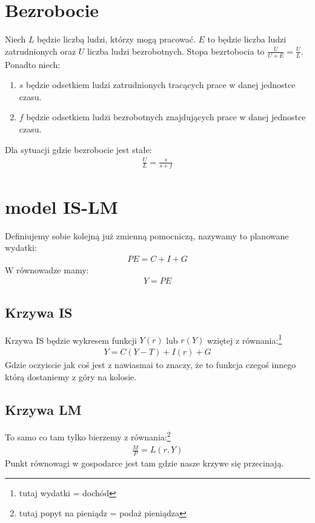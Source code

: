\documentclass{article}
\begin{document}
\section{Bezrobocie}
Niech \(L\) będzie liczbą ludzi, którzy mogą pracować. \(E\) to będzie
liczba ludzi zatrudnionych oraz \(U\) liczba ludzi bezrobotnych. 
Stopa bezrtobocia to \(\frac{U}{U+E} = \frac{U}{L}\). Ponadto niech:
\begin{enumerate}
    \item \(s\) będzie odsetkiem ludzi zatrudnionych tracących prace w danej jednostce czasu.
    \item \(f\) będzie odsetkiem ludzi bezrobotnych znajdujących prace w danej jednostce czasu.
\end{enumerate}
Dla sytuacji gdzie bezrobocie jest stałe:
\begin{gather}
    \frac{U}{L} = \frac{s}{s+f}
\end{gather}
\section{model IS-LM}
Definiujemy sobie kolejną już zmienną pomocniczą, nazywamy to planowane wydatki:
\begin{gather}
    PE = C + I + G
\end{gather}
W równowadze mamy:
\begin{gather}
    Y = PE
\end{gather}
\subsection{Krzywa IS}
Krzywa IS będzie wykresem funkcji \(Y(r)\) lub \(r(Y)\) wziętej z równania:\footnote{tutaj wydatki = dochód}
\begin{gather}
    Y = C(Y - T) + I(r) + G
\end{gather}
Gdzie oczyiscie jak coś jest z nawiasmai to znaczy, że to funkcja czegoś innego
którą dostaniemy z góry na kolosie. 
\subsection{Krzywa LM}
To samo co tam tylko bierzemy z równania:\footnote{tutaj popyt na pieniądz = podaż pieniądza}    
\begin{gather}
    \frac{M}{P} = L(r,Y)
\end{gather}
Punkt równowagi w gospodarce jest tam gdzie nasze krzywe się przecinają.
\end{document}
